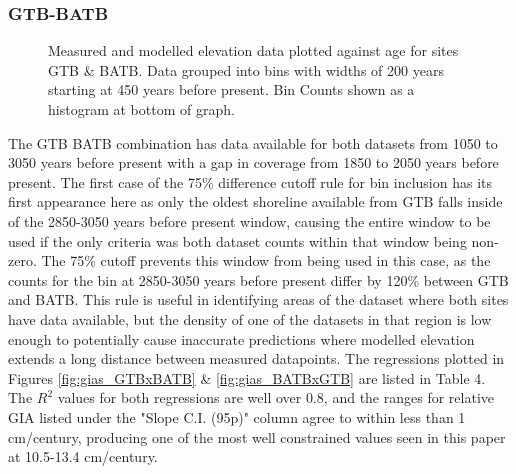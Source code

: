 \subsubsection{GTB-BATB}

\begin{figure}[H]
	\caption{Measured and modelled elevation data plotted against age for sites GTB \& BATB. Data grouped into bins with widths of 200 years starting at 450 years before present. Bin Counts shown as a histogram at bottom of graph.}	
	\label{fig:data_GTBxBATB}
\end{figure}
The GTB BATB combination has data available for both datasets from 1050 to 3050 years before present with 
a gap in coverage from 1850 to 2050 years before present. The first case of the
75\% difference cutoff rule for bin inclusion has its first appearance here as
only the oldest shoreline available from GTB falls inside of the 2850-3050 years
before present window, causing the entire window to be
used if the only criteria was both dataset counts within that window being non-zero.
The 75\% cutoff prevents this window from being used in this case, as the counts
for the bin at 2850-3050 years before present differ by 120\% between GTB and BATB. This rule is useful in identifying
areas of the dataset where both sites have data available, but the density of
one of the datasets in that region is low enough to potentially cause inaccurate
predictions where modelled elevation extends a long distance between measured datapoints.
The regressions plotted in
Figures \ref{fig:gias_GTBxBATB} \& \ref{fig:gias_BATBxGTB} are listed in 
Table 4. The $R^2$ values for both regressions
are well over 0.8, and the ranges for relative GIA listed under the "Slope C.I. (95p)" column
agree to within less than 1 cm/century,
producing one of the most well constrained values seen in this paper at 10.5-13.4 cm/century. \\


